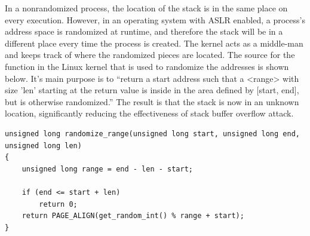 In a nonrandomized process, the location of the stack is in the same place on every execution. However, in an operating system with ASLR enabled, a process’s address space is randomized at runtime, and therefore the stack will be in a different place every time the process is created. The kernel acts as a middle-man and keeps track of where the randomized pieces are located. The source for the function in the Linux kernel that is used to randomize the addresses is shown below. It’s main purpose is to “return a start address such that a <range> with size 'len' starting at the return value is inside in the area defined by [start, end], but is otherwise randomized.” \cite{randomc} The result is that the stack is now in an unknown location, significantly reducing the effectiveness of stack buffer overflow attack.

\begin{lstlisting}[caption=Source for the range randomization function]
unsigned long randomize_range(unsigned long start, unsigned long end, unsigned long len)
{
	unsigned long range = end - len - start;

	if (end <= start + len)
		return 0;
	return PAGE_ALIGN(get_random_int() % range + start);
}
\end{lstlisting}
